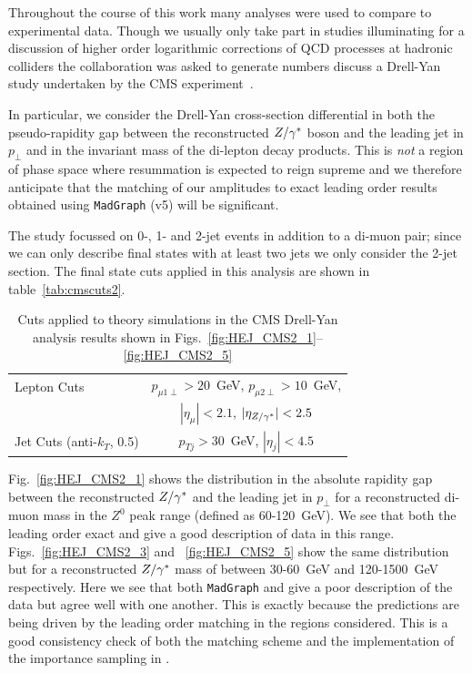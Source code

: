 		Throughout the course of this work many analyses were used to compare \hej to experimental
		data.  Though we usually only take part in studies illuminating for a discussion of higher order
		logarithmic corrections of QCD processes at hadronic colliders the \hej collaboration was asked to
		generate numbers discuss a Drell-Yan study undertaken by the CMS experiment~\cite{CMS:2014vtk}.

		In particular, we consider
		the Drell-Yan cross-section differential in both the pseudo-rapidity gap between the reconstructed
		$Z/\gamma^*$ boson and the leading jet in $p_\perp$ and in the invariant mass of the di-lepton decay
		products.  This is \emph{not} a region of phase space where resummation is expected to reign
		supreme and we therefore anticipate that the matching of our \hej amplitudes to exact leading
		order results obtained using \texttt{MadGraph} (v5) will be significant.

		The study focussed on 0-, 1- and 2-jet events in addition to a di-muon pair; since we can
		only describe final states with at least two jets we only consider the 2-jet section.  The
		final state cuts applied in this analysis are shown in table~\eqref{tab:cmscuts2}.

		\begin{table}[hbt]
		  \centering
		  \begin{tabular}{|l|c|}
		    \hline
		    Lepton Cuts & $p_{\mu1\perp}>20$~GeV, \; $p_{\mu2\perp}>10$~GeV, \\
		    & \; $|\eta_\mu|<2.1$, \; $|\eta_{Z/\gamma^*}|<2.5$ \\ \hline
		    Jet Cuts (anti-$k_T$, 0.5) & $p_{Tj}>30$~GeV, \; $|\eta_j|<4.5$ \\ \hline
		  \end{tabular}
		  \caption{Cuts applied to theory simulations in the CMS
		   Drell-Yan analysis results shown in
		    Figs.~\eqref{fig:HEJ_CMS2_1}--\eqref{fig:HEJ_CMS2_5}}
		  \label{tab:cmscuts2}
		\end{table}

		Fig.~\eqref{fig:HEJ_CMS2_1} shows the distribution in the absolute rapidity gap
		between the reconstructed $Z/\gamma^*$ and the leading jet in $p_\perp$ for a reconstructed
		di-muon mass in the $Z^0$ peak range (defined as 60-120~GeV).  We see that both the
		leading order exact and \HEJ give a good description of data in this range.
		Figs.~\eqref{fig:HEJ_CMS2_3} and ~\eqref{fig:HEJ_CMS2_5} show the same distribution
		but for a reconstructed $Z/\gamma^*$ mass of between 30-60~GeV and 120-1500~GeV respectively.
		Here we see that both \texttt{MadGraph} and \HEJ give a poor description of the data but
		agree well with one another.  This is exactly because the \HEJ predictions are being
		driven by the leading order matching in the regions considered.  This is a good
		consistency check of both the \hej matching scheme and the implementation of the
		importance sampling in \HEJ.

